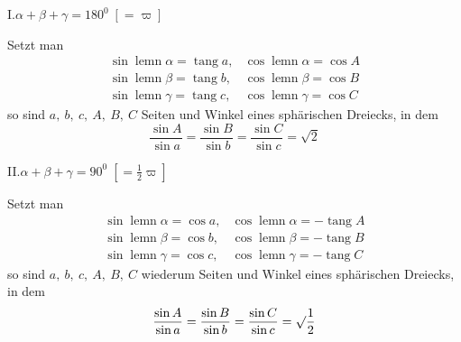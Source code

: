 \noindent I.\hfill $\alpha+\beta+\gamma=180^0\;[=\varpi]$\hfill\mbox{}

Setzt man
\[
\begin{array}{ll}
\sin\operatorname{lemn}\alpha=\operatorname{tang}a,&\cos\operatorname{lemn}\alpha=\cos A\\[5pt]
\sin\operatorname{lemn}\beta=\operatorname{tang}b,&\cos\operatorname{lemn}\beta=\cos B\\[5pt]
\sin\operatorname{lemn}\gamma=\operatorname{tang}c,&\cos\operatorname{lemn}\gamma=\cos C
\end{array}
\]
so sind $a,\ b,\ c,\ A,\ B,\ C$ Seiten und Winkel eines sphärischen Dreiecks, in dem
\[
\dfrac{\sin A}{\sin a}=\dfrac{\sin B}{\sin b}=\dfrac{\sin C}{\sin c}=\surd2
\]

\par{}\noindent II.\hfill $\alpha+\beta+\gamma=90^0\;[=\tfrac12\varpi]$\hfill\mbox{}

Setzt man
\[
\begin{array}{ll}
\sin\operatorname{lemn}\alpha=\cos a,&\cos\operatorname{lemn}\alpha=-\operatorname{tang}A\\[5pt]
\sin\operatorname{lemn}\beta=\cos b,&\cos\operatorname{lemn}\beta=-\operatorname{tang}B\\[5pt]
\sin\operatorname{lemn}\gamma=\cos c,&\cos\operatorname{lemn}\gamma=-\operatorname{tang}C
\end{array}
\]
so sind $a,\ b,\ c,\ A,\ B,\ C$ wiederum Seiten und Winkel eines sphärischen Dreiecks, in dem
\[
\dfrac{\sin A}{\sin a}=\dfrac{\sin B}{\sin b}=\dfrac{\sin C}{\sin c}=\surd\dfrac12
\]

\clearpage
\endgroup
